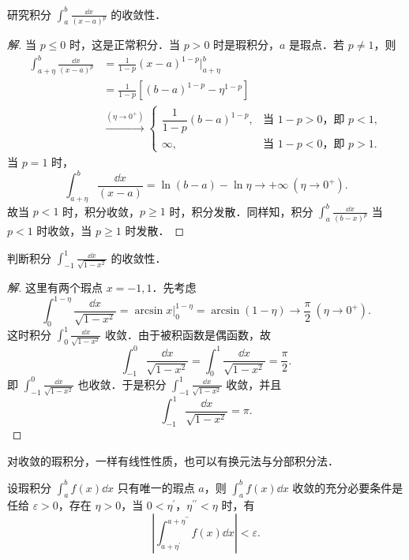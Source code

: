 \begin{example}\label{ex:11-2-1}
研究积分 $\displaystyle\int_{a}^{b}\frac{\dd x}{(x-a)^{p}}$ 的收敛性．
\end{example}

\begin{proof}[解]
当 $p\leqslant 0$ 时，这是正常积分．当 $p>0$ 时是瑕积分，$a$ 是瑕点．若 $p\neq 1$，则
\[
\begin{aligned}
\int_{a+\eta}^{b}\frac{\dd x}{(x-a)^{p}}
&=\frac{1}{1-p}(x-a)^{1-p}\bigg|_{a+\eta}^{b}\\
&=\frac{1}{1-p}\left[(b-a)^{1-p}-\eta^{1-p}\right]\\
&\xrightarrow{(\eta\to 0^{+})}\begin{cases}
\dfrac{1}{1-p}(b-a)^{1-p}, & \text{当 }1-p>0\text{，即 }p<1,\\[4pt]
\infty, & \text{当 }1-p<0\text{，即 }p>1.
\end{cases}
\end{aligned}
\]
当 $p=1$ 时，
\[
\int_{a+\eta}^{b}\frac{\dd x}{(x-a)}=\ln(b-a)-\ln\eta\to+\infty\ (\eta\to 0^{+}).
\]
故当 $p<1$ 时，积分收敛，$p\geqslant 1$ 时，积分发散．同样知，积分 $\displaystyle\int_{a}^{b}\frac{\dd x}{(b-x)^{p}}$ 当 $p<1$ 时收敛，当 $p\geqslant 1$ 时发散．
\end{proof}

\begin{example}\label{ex:11-2-2}
判断积分 $\displaystyle\int_{-1}^{1}\frac{\dd x}{\sqrt{1-x^{2}}}$ 的收敛性．
\end{example}

\begin{proof}[解]
这里有两个瑕点 $x=-1,1$．先考虑
\[
\int_{0}^{1-\eta}\frac{\dd x}{\sqrt{1-x^{2}}}=\arcsin x\Big|_{0}^{1-\eta}=\arcsin(1-\eta)\to\frac{\pi}{2}\ (\eta\to 0^{+}).
\]
这时积分 $\displaystyle\int_{0}^{1}\frac{\dd x}{\sqrt{1-x^{2}}}$ 收敛．由于被积函数是偶函数，故
\[
\int_{-1}^{0}\frac{\dd x}{\sqrt{1-x^{2}}}=\int_{0}^{1}\frac{\dd x}{\sqrt{1-x^{2}}}=\frac{\pi}{2}.
\]
即 $\displaystyle\int_{-1}^{0}\frac{\dd x}{\sqrt{1-x^{2}}}$ 也收敛．于是积分 $\displaystyle\int_{-1}^{1}\frac{\dd x}{\sqrt{1-x^{2}}}$ 收敛，并且
\[
\int_{-1}^{1}\frac{\dd x}{\sqrt{1-x^{2}}}=\pi.
\]
\end{proof}

对收敛的瑕积分，一样有线性性质，也可以有换元法与分部积分法．

\begin{theorem}[柯西收敛原理]\label{thm:11-8}
设瑕积分 $\displaystyle\int_{a}^{b}f(x)\dd x$ 只有唯一的瑕点 $a$，则 $\displaystyle\int_{a}^{b}f(x)\dd x$ 收敛的充分必要条件是任给 $\varepsilon>0$，存在 $\eta>0$，当 $0<\eta^{\prime}$，$\eta^{\prime\prime}<\eta$ 时，有
\[
\left|\int_{a+\eta^{\prime}}^{a+\eta^{\prime\prime}}f(x)\dd x\right|<\varepsilon.
\]
\end{theorem}

